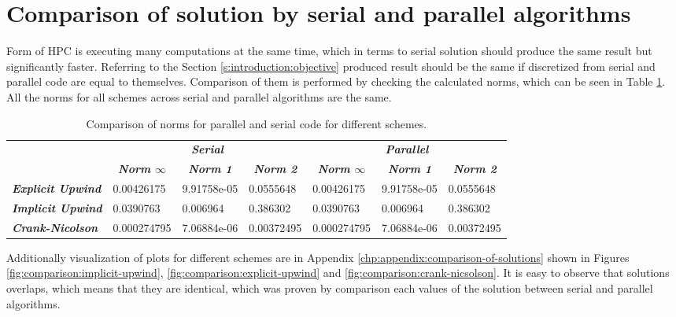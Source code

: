 \section{Comparison of solution by serial and parallel algorithms} \label{s:results:compare-solutions-serial-parallel}

	Form of \gls{HPC} is executing many computations at the same time, which in terms to serial solution should produce the same result but significantly faster. Referring to the Section \ref{s:introduction:objective} produced result should be the same if discretized from serial and parallel code are equal to themselves. Comparison of them is performed by checking the calculated norms, which can be seen in Table \ref{tab:comparison-serial-parallel}. All the norms for all schemes across serial and parallel algorithms are the same.
	\begin{table}[!htbp]
		\centering
		\caption{Comparison of norms for parallel and serial code for different schemes.}
		\label{tab:comparison-serial-parallel}
		\begin{tabular}{l|l|l|l|l|l|l|}
			\cline{2-7}
			& \multicolumn{3}{c|}{\textit{\textbf{Serial}}} & \multicolumn{3}{c|}{\textit{\textbf{Parallel}}} \\ \cline{2-7} 
			& \multicolumn{1}{c|}{\textit{\textbf{Norm $\infty$}}} & \multicolumn{1}{c|}{\textit{\textbf{Norm 1}}} & \multicolumn{1}{c|}{\textit{\textbf{Norm 2}}} & \multicolumn{1}{c|}{\textit{\textbf{Norm $\infty$}}} & \multicolumn{1}{c|}{\textit{\textbf{Norm 1}}} & \multicolumn{1}{c|}{\textit{\textbf{Norm 2}}} \\ \hline
			\multicolumn{1}{|l|}{\textit{\textbf{Explicit Upwind}}} & 0.00426175 & 9.91758e-05 & 0.0555648 & 0.00426175 & 9.91758e-05 & 0.0555648 \\ \hline
			\multicolumn{1}{|l|}{\textit{\textbf{Implicit Upwind}}} & 0.0390763 & 0.006964 & 0.386302 & 0.0390763 & 0.006964 & 0.386302 \\ \hline
			\multicolumn{1}{|l|}{\textit{\textbf{Crank-Nicolson}}} & 0.000274795 & 7.06884e-06 & 0.00372495 & 0.000274795 & 7.06884e-06 & 0.00372495 \\ \hline
		\end{tabular}
	\end{table}
	Additionally visualization of plots for different schemes are in Appendix \ref{chp:appendix:comparison-of-solutions} shown in Figures \ref{fig:comparison:implicit-upwind}, \ref{fig:comparison:explicit-upwind} and \ref{fig:comparison:crank-nicsolson}. It is easy to observe that solutions overlaps, which means that they are identical, which was proven by comparison each values of the solution between serial and parallel algorithms.
	
	
	
